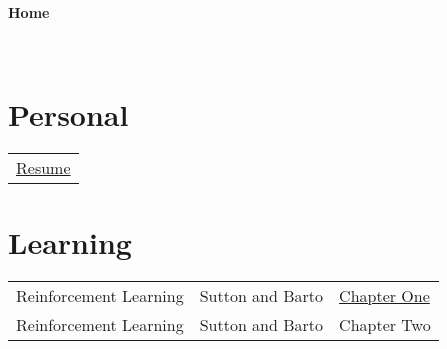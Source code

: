 \documentclass[11pt]{article}
\begin{document}
~
~

\begin{center}
  {
	\fontsize{1.5cm}{1.5cm}
        \textcolor{CalPolyGreen}{\textbf{Home}}
  }

\end{center}

~
~


\section*{\textcolor{CalPolyGreen}{Personal}}
\begin{tabular}{l}
	\href{https://lilcpuppy.github.io/resume.html}{Resume}
\end{tabular}

\section*{\textcolor{CalPolyGreen}{Learning}}
\begin{tabular}{lll}
	Reinforcement Learning	& Sutton and Barto  & \href{https://lilcpuppy.github.io/reinforcement_learning_chapter_one.html}{Chapter One}   \\
	Reinforcement Learning	& Sutton and Barto  & Chapter Two   \\
\end{tabular}
\end{document}
